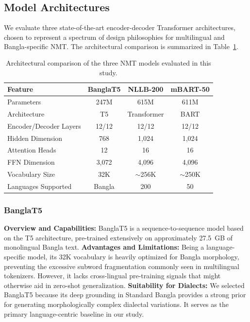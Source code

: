 \documentclass[12pt,a4paper]{article}
\begin{document}
\subsection{Model Architectures}
We evaluate three state-of-the-art encoder-decoder Transformer \cite{vaswani2017attention} architectures, chosen to represent a spectrum of design philosophies for multilingual and Bangla-specific NMT. The architectural comparison is summarized in Table~\ref{tab:model_specs}.

\begin{table}[htbp]
\centering
\caption{Architectural comparison of the three NMT models evaluated in this study.}
\label{tab:model_specs}
\begin{tabular}{l c c c}
\toprule
\textbf{Feature} & \textbf{BanglaT5} & \textbf{NLLB-200} & \textbf{mBART-50} \\
\midrule
Parameters          & 247M    & 615M    & 611M \\
Architecture        & T5      & Transformer & BART \\
Encoder/Decoder Layers & 12/12 & 12/12 & 12/12 \\
Hidden Dimension    & 768     & 1,024   & 1,024 \\
Attention Heads     & 12      & 16      & 16 \\
FFN Dimension       & 3,072   & 4,096   & 4,096 \\
Vocabulary Size     & 32K     & $\sim$256K & $\sim$250K \\
Languages Supported & Bangla  & 200     & 50 \\
\bottomrule
\end{tabular}
\end{table}

\subsubsection{BanglaT5}
\textbf{Overview and Capabilities:} BanglaT5 \cite{bhattacharjee-etal-2023-banglanlg} is a sequence-to-sequence model based on the T5 \cite{raffel2020exploring} architecture, pre-trained extensively on approximately 27.5~GB of monolingual Bangla text. 
\textbf{Advantages and Limitations:} Being a language-specific model, its 32K vocabulary is heavily optimized for Bangla morphology, preventing the excessive subword fragmentation commonly seen in multilingual tokenizers. However, it lacks cross-lingual pre-training signals that might otherwise aid in zero-shot generalization.
\textbf{Suitability for Dialects:} We selected BanglaT5 because its deep grounding in Standard Bangla provides a strong prior for generating morphologically complex dialectal variations. It serves as the primary language-centric baseline in our study.
\end{document}
